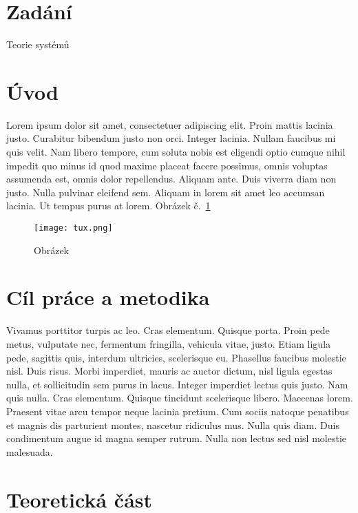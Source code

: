 \section*{Zadání}
Teorie systémů

\section{Úvod}
Lorem ipsum dolor sit amet, consectetuer adipiscing elit. Proin mattis lacinia justo. Curabitur bibendum justo non orci. Integer lacinia. Nullam faucibus mi quis velit. Nam libero tempore, cum soluta nobis est eligendi optio cumque nihil impedit quo minus id quod maxime placeat facere possimus, omnis voluptas assumenda est, omnis dolor repellendus. Aliquam ante. Duis viverra diam non justo. Nulla pulvinar eleifend sem. Aliquam in lorem sit amet leo accumsan lacinia. Ut tempus purus at lorem. Obrázek č.~\ref{fig:tux}

\begin{figure}[htbp]
  \centering
  \texttt{[image: tux.png]}
  \caption{Obrázek}
  \label{fig:tux}
\end{figure}

\section{Cíl práce a metodika}
Vivamus porttitor turpis ac leo. Cras elementum. Quisque porta. Proin pede metus, vulputate nec, fermentum fringilla, vehicula vitae, justo. Etiam ligula pede, sagittis quis, interdum ultricies, scelerisque eu. Phasellus faucibus molestie nisl. Duis risus. Morbi imperdiet, mauris ac auctor dictum, nisl ligula egestas nulla, et sollicitudin sem purus in lacus. Integer imperdiet lectus quis justo. Nam quis nulla. Cras elementum. Quisque tincidunt scelerisque libero. Maecenas lorem. Praesent vitae arcu tempor neque lacinia pretium. Cum sociis natoque penatibus et magnis dis parturient montes, nascetur ridiculus mus. Nulla quis diam. Duis condimentum augue id magna semper rutrum. Nulla non lectus sed nisl molestie malesuada.

\section{Teoretická část}

